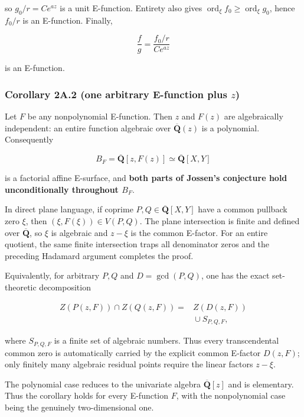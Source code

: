 so \(g_0/r=Ce^{az}\) is a unit E-function. Entirety also gives
\(\operatorname{ord}_\xi f_0\ge\operatorname{ord}_\xi g_0\), hence
\(f_0/r\) is an E-function. Finally,

\[
  \frac fg=\frac{f_0/r}{Ce^{az}}
\]

is an E-function.

\subsubsection{\texorpdfstring{Corollary 2A.2 (one arbitrary E-function plus \(z\))}{Corollary 2A.2 (one arbitrary E-function plus z)}}

Let \(F\) be any nonpolynomial E-function. Then \(z\) and \(F(z)\) are
algebraically independent: an entire function algebraic over
\(\overline{\mathbf Q}(z)\) is a polynomial. Consequently

\[
  B_F=\overline{\mathbf Q}[z,F(z)]
  \simeq\overline{\mathbf Q}[X,Y]
\]

is a factorial affine E-surface, and \textbf{both parts of Jossen's conjecture hold
unconditionally throughout \(B_F\)}.

In direct plane language, if coprime \(P,Q\in\overline{\mathbf Q}[X,Y]\)
have a common pullback zero \(\xi\), then
\((\xi,F(\xi))\in V(P,Q)\). The plane intersection is finite and defined
over \(\overline{\mathbf Q}\), so \(\xi\) is algebraic and \(z-\xi\) is the
common E-factor. For an entire quotient, the same finite intersection traps
all denominator zeros and the preceding Hadamard argument completes the
proof.

Equivalently, for arbitrary \(P,Q\) and
\(D=\gcd(P,Q)\), one has the exact set-theoretic decomposition

\[
 \begin{aligned}
 Z(P(z,F))\cap Z(Q(z,F))
  ={}& Z(D(z,F))\\
    &{}\cup S_{P,Q,F},
 \end{aligned}                                                \tag{J-2A.3}
\]

where \(S_{P,Q,F}\) is a finite set of algebraic numbers. Thus every
transcendental common zero is automatically carried by the explicit common
E-factor \(D(z,F)\); only finitely many algebraic residual points require the
linear factors \(z-\xi\).

The polynomial case reduces to the univariate algebra
\(\overline{\mathbf Q}[z]\) and is elementary. Thus the corollary holds for
every E-function \(F\), with the nonpolynomial case being the genuinely
two-dimensional one.

